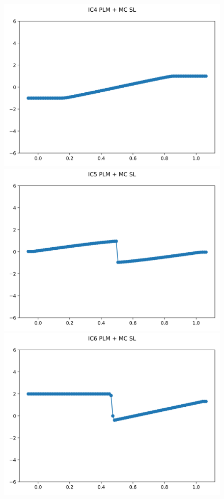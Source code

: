 \documentclass{article}
\begin{document}
\begin{figure}[t]
        \includegraphics[width=.95\textwidth]{../../code/hires_IC4Methodpo_plot.png}
        \includegraphics[width=.95\textwidth]{../../code/hires_IC5Methodpo_plot.png}
        \includegraphics[width=.95\textwidth]{../../code/hires_IC6Methodpo_plot.png}

\end{figure}
\end{document}
